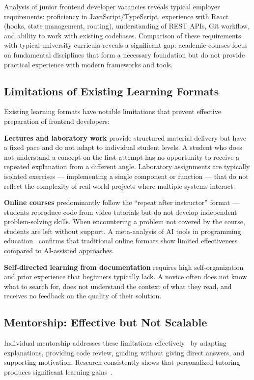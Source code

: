 \documentclass[conference,a4paper]{IEEEtran}
\begin{document}
Analysis of junior frontend developer vacancies reveals typical employer requirements: proficiency in JavaScript/TypeScript, experience with React (hooks, state management, routing), understanding of REST APIs, Git workflow, and ability to work with existing codebases. Comparison of these requirements with typical university curricula reveals a significant gap: academic courses focus on fundamental disciplines that form a necessary foundation but do not provide practical experience with modern frameworks and tools.

\subsection{Limitations of Existing Learning Formats}

Existing learning formats have notable limitations that prevent effective preparation of frontend developers:

\textbf{Lectures and laboratory work} provide structured material delivery but have a fixed pace and do not adapt to individual student levels. A student who does not understand a concept on the first attempt has no opportunity to receive a repeated explanation from a different angle. Laboratory assignments are typically isolated exercises --- implementing a single component or function --- that do not reflect the complexity of real-world projects where multiple systems interact.

\textbf{Online courses} predominantly follow the ``repeat after instructor'' format --- students reproduce code from video tutorials but do not develop independent problem-solving skills. When encountering a problem not covered by the course, students are left without support. A meta-analysis of AI tools in programming education~\cite{mdpi2025} confirms that traditional online formats show limited effectiveness compared to AI-assisted approaches.

\textbf{Self-directed learning from documentation} requires high self-organization and prior experience that beginners typically lack. A novice often does not know what to search for, does not understand the context of what they read, and receives no feedback on the quality of their solution.

\subsection{Mentorship: Effective but Not Scalable}

Individual mentorship addresses these limitations effectively~\cite{begel2008} by adapting explanations, providing code review, guiding without giving direct answers, and supporting motivation. Research consistently shows that personalized tutoring produces significant learning gains~\cite{nature2025, brookings2025}.
\end{document}
